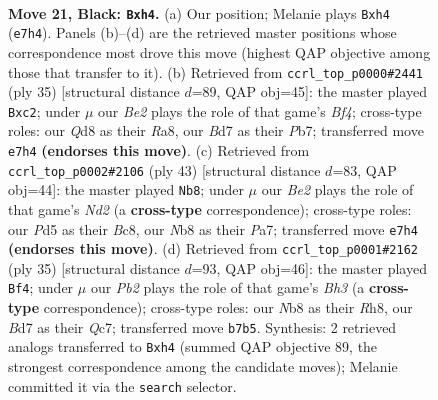 \documentclass[11pt]{article}
\begin{document}
\clearpage

\begin{figure}[p]\centering
\begin{subfigure}{0.46\textwidth}\centering
\resizebox{\linewidth}{!}{%
\newchessgame
\chessboard[
  setfen={rn1qr1k1/pp1bbppp/8/2PpP3/6PN/P1N5/1P1B1PP1/1BRQR1K1 b - - 0 21},
  showmover=false,
  pgfstyle=straightmove, color=movearrow, markmove={e7-h4}
]}
\caption{}
\end{subfigure}\hfill
\begin{subfigure}{0.46\textwidth}\centering
\resizebox{\linewidth}{!}{%
\newchessgame
\chessboard[
  setfen={r4r1k/1pq1b1p1/n2p3p/p3pb2/P7/2P1BN1P/1PB2PP1/R2QR1K1 b - - 1 18},
  showmover=false,
  pgfstyle=straightmove, color=movearrow, markmove={f5-c2}
]}
\caption{}
\end{subfigure}
\\[4pt]
\begin{subfigure}{0.46\textwidth}\centering
\resizebox{\linewidth}{!}{%
\newchessgame
\chessboard[
  setfen={r1b1qr1k/pp1nb1pp/8/3pPp2/1P6/P2BBN2/2Q2P1P/2R1R2K b - - 1 22},
  showmover=false,
  pgfstyle=straightmove, color=movearrow, markmove={d7-b8}
]}
\caption{}
\end{subfigure}\hfill
\begin{subfigure}{0.46\textwidth}\centering
\resizebox{\linewidth}{!}{%
\newchessgame
\chessboard[
  setfen={2r1k2r/1bq1np2/p2p1p1b/1p3p1p/4P3/PNNB4/1PP3PP/1K1RQ2R b k - 1 18},
  showmover=false,
  pgfstyle=straightmove, color=movearrow, markmove={h6-f4}
]}
\caption{}
\end{subfigure}
\caption{\textbf{Move 21, Black: \texttt{Bxh4}.} (a) Our position; Melanie plays \texttt{Bxh4} (\texttt{e7h4}). Panels (b)--(d) are the retrieved master positions whose correspondence most drove this move (highest QAP objective among those that transfer to it). (b) Retrieved from \texttt{ccrl\_top\_p0000\#2441} (ply 35) [structural distance $d$=89, QAP obj=45]: the master played \texttt{Bxc2}; under $\mu$ our \emph{Be2} plays the role of that game's \emph{Bf4}; cross-type roles: our \emph{Q}d8 as their \emph{R}a8, our \emph{B}d7 as their \emph{P}b7; transferred move \texttt{e7h4} \textbf{(endorses this move)}. (c) Retrieved from \texttt{ccrl\_top\_p0002\#2106} (ply 43) [structural distance $d$=83, QAP obj=44]: the master played \texttt{Nb8}; under $\mu$ our \emph{Be2} plays the role of that game's \emph{Nd2} (a \textbf{cross-type} correspondence); cross-type roles: our \emph{P}d5 as their \emph{B}c8, our \emph{N}b8 as their \emph{P}a7; transferred move \texttt{e7h4} \textbf{(endorses this move)}. (d) Retrieved from \texttt{ccrl\_top\_p0001\#2162} (ply 35) [structural distance $d$=93, QAP obj=46]: the master played \texttt{Bf4}; under $\mu$ our \emph{Pb2} plays the role of that game's \emph{Bh3} (a \textbf{cross-type} correspondence); cross-type roles: our \emph{N}b8 as their \emph{R}h8, our \emph{B}d7 as their \emph{Q}c7; transferred move \texttt{b7b5}. Synthesis: 2 retrieved analogs transferred to \texttt{Bxh4} (summed QAP objective 89, the strongest correspondence among the candidate moves); Melanie committed it via the \texttt{search} selector.}
\label{fig:thought-m41}
\end{figure}
\end{document}
